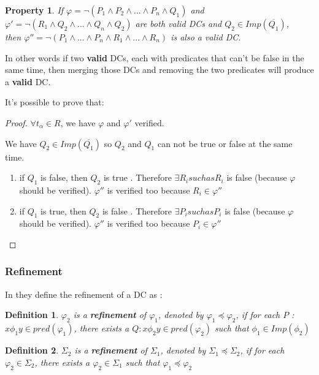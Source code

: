 \documentclass[letterpaper, 12pt]{report}
\newtheorem{mydef}{Definition}
\newtheorem{myprop}{Property}
\begin{document}
\begin{myprop}
	If $\varphi = \neg (P_1 \wedge P_2 \wedge ... \wedge P_n \wedge Q_1)$ and $\varphi ' = \neg (R_1 \wedge Q_2 \wedge ... \wedge Q_n \wedge Q_2)$ are both valid DCs and $Q_2 \in Imp(\overline{Q_1})$, \\ then $ \varphi '' = \neg(P_1 \wedge ... \wedge P_n \wedge R_1 \wedge ... \wedge R_n)$ is also a valid DC.
\end{myprop}

In other words if two \textbf{valid} DCs, each with predicates that can't be false in the same time, then merging those DCs and removing the two predicates will produce a \textbf{valid} DC.

It's possible to prove that:

\begin{proof}
	$\forall t_\alpha \in R$, we have $\varphi$ and $\varphi '$ verified.
	
\hspace*{0.5cm}	We have $Q_2 \in Imp(\overline{Q_1})$ so $Q_2$ and $Q_1$ can not be true or false at the same time.
	\begin{enumerate}
	 \item if $Q_1$ is false, then $Q_2$ is true . Therefore $\exists R_i such as R_i$ is false (because $\varphi$ should be verified). $\varphi ''$ is verified too because $R_i \in \varphi ''$
	 \item if $Q_1$ is true, then $Q_2$ is false . Therefore $\exists P_i such as P_i$ is false (because $\varphi$ should be verified). $\varphi ''$ is verified too because $P_i \in \varphi ''$
	\end{enumerate}
\end{proof}

\subsubsection{Refinement}
\label{RefinementSection}
In \cite{main} they define the refinement of a DC as :

\begin{mydef}
 $\varphi_2$ is a \textbf{refinement} of $\varphi_1$, denoted by $\varphi_1 \preceq \varphi_2$, if for each $ P$ : $x\phi_1 y \in pred(\varphi_1)$, there exists a $Q : x \phi_2 y \in pred(\varphi_2)$ such that $\phi_1 \in Imp(\phi_2)$
\end{mydef}

\begin{mydef}
 $\Sigma_2$ is a \textbf{refinement} of $\Sigma_1$, denoted by $\Sigma_1 \preceq \Sigma_2$, if for each $ \varphi_2 \in \Sigma_2$, there exists a $\varphi_2 \in \Sigma_1$ such that $\varphi_1 \preceq \varphi_2$
\end{mydef}
\end{document}
